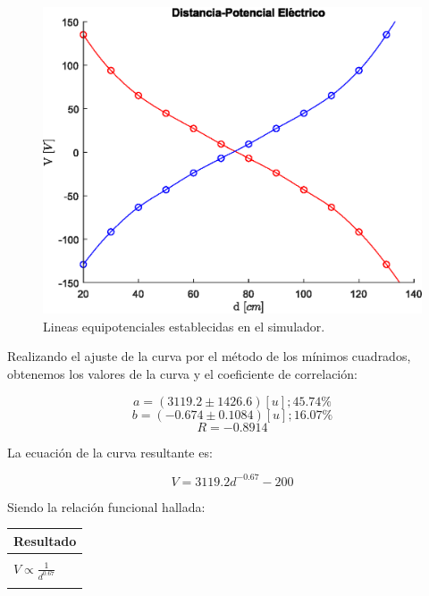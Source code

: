 \documentclass[letter,11pt]{article}
\begin{document}
\begin{enumerate}
\begin{figure}[!h]
\centering
\includegraphics[scale=0.91]{resources/p4.eps}
\caption{Lineas equipotenciales establecidas en el simulador.}
\label{figura13}
\end{figure}

Realizando el ajuste de la curva por el método de los mínimos cuadrados,
obtenemos los valores de la curva y el coeficiente de correlación:

\begin{equation*}
    a = (3119.2 \pm 1426.6)[u]; 45.74 \%
\end{equation*}
\begin{equation*}
    b = (-0.674 \pm 0.1084)[u]; 16.07 \%
\end{equation*}
\begin{equation*}
    R = -0.8914
\end{equation*}

La ecuación de la curva resultante es:

\begin{equation*}
    V = 3119.2 d^{-0.67} - 200
\end{equation*}

Siendo la relación funcional hallada:

\begin{center}
\begin{tabular}{|>{\centering}m{9.2cm}<{\centering}|}
\hline
\textbf{Resultado} 
\tabularnewline \hline
\\
\Large{$V \propto \frac{1}{d^{0.67}}$} \tabularnewline
\\
\hline
\end{tabular}
\end{center}


\end{enumerate}
\end{document}
